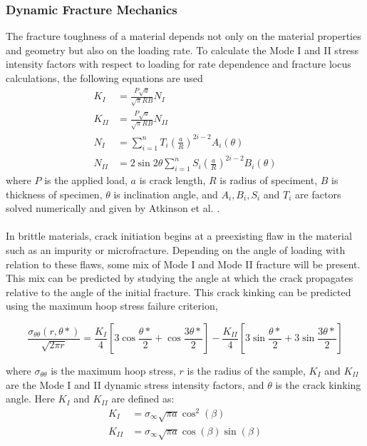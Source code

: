 \documentclass[12pt]{article}
\begin{document}
\subsubsection{Dynamic Fracture Mechanics} %
The fracture toughness of a material depends not only on the material properties and geometry but also on the loading rate. To calculate the Mode I and II stress intensity factors with respect to loading for rate dependence and fracture locus calculations, the following equations are used
\begin{align}
K_I &= \frac{P\sqrt{a}}{\sqrt{\pi}RB}N_I\\
K_{II} &= \frac{P\sqrt{a}}{\sqrt{\pi}RB}N_{II}\\
N_I &= \displaystyle\sum_{i=1}^{n} T_i\left(\frac{a}{R}\right)^{2i-2} A_i(\theta)\\
N_{II} &= 2\sin2\theta\displaystyle\sum_{i=1}^{n} S_i\left(\frac{a}{R}\right)^{2i-2}B_i(\theta)
\end{align}
where $P$ is the applied load, $a$ is crack length, $R$ is radius of speciment, $B$ is thickness of specimen, $\theta$ is inclination angle, and $A_i, B_i, S_i$ and $T_i$ are factors solved numerically and given by Atkinson et al. \cite{Atkinson}.
\\ \\
In brittle materials, crack initiation begins at a preexisting flaw in the material such as an impurity or microfracture. Depending on the angle of loading with relation to these flaws, some mix of Mode I and Mode II fracture will be present. This mix can be predicted by studying the angle at which the crack propagates relative to the angle of the initial fracture. This crack kinking can be predicted using the maximum hoop stress failure criterion, 

\begin{equation}
\frac{\sigma_{\theta\theta}(r,\theta*)}{\sqrt{2\pi r}} = \frac{K_I}{4}\left[3\cos\frac{\theta*}{2}+\cos\frac{3\theta*}{2}\right]-\frac{K_{II}}{4}\left[3\sin\frac{\theta*}{2}+3\sin\frac{3\theta*}{2}\right]
\end{equation}

where $\sigma_{\theta\theta}$ is the maximum hoop stress, $r$ is the radius of the sample, $K_{I}$ and $K_{II}$ are the Mode I and II dynamic stress intensity factors, and $\theta$ is the crack kinking angle. Here $K_{I}$ and $ K_{II}$ are defined as:
\begin{align}
K_{I}&=\sigma_{\infty} \sqrt{\pi a} \cos^2(\beta)\\
K_{II}&=\sigma_{\infty} \sqrt{\pi a} \cos(\beta)\sin(\beta)
\end{align}
\end{document}
